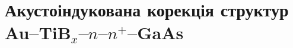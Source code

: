 %
%
%
%
%
%
%
%
%
%




%




\section{Акустоіндукована корекція структур Au--TiB$_x$--$n$--$n^+$--GaAs\label{MSGA}}

